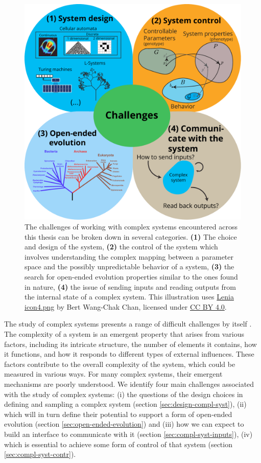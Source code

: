 \begin{figure}[htbp]
  \centering
  \includegraphics[width=.98\linewidth]{figures/challenges}
  \caption{The challenges of working with complex systems encountered across
    this thesis can be broken down in several categories. \textbf{(1)} The choice
    and design of the system, \textbf{(2)} the control of the system which
    involves understanding the complex mapping between a parameter space and the
    possibly unpredictable behavior of a system, \textbf{(3)} the search for
    open-ended evolution properties similar to the ones found in nature,
    \textbf{(4)} the issue of sending inputs and reading outputs from the
    internal state of a complex system. This illustration uses
    \href{https://commons.wikimedia.org/wiki/File:Lenia_icon4.png}{Lenia
      icon4.png} by Bert Wang-Chak Chan, licensed under
    \href{https://creativecommons.org/licenses/by-sa/4.0/}{CC BY 4.0}. }
  \label{fig:challenges}
\end{figure}

The study of complex systems presents a range of difficult challenges by itself
\parencite{sanmiguelChallengesComplexSystems2012}. 
The complexity of a system is an emergent property that arises from various factors, 
including its intricate structure, the number of elements it contains, how it functions, 
and how it responds to different types of external influences. These factors contribute 
to the overall complexity of the system, which could be measured in various ways.
For many complex systems, their emergent mechanisms are
poorly understood. We identify four main challenges associated with the study of
complex systems: (i) the questions of the design choices in defining and sampling a
complex system (section \ref{sec:design-compl-syst}), (ii) which will in turn define
their potential to support a form of open-ended evolution (section
\ref{sec:open-ended-evolution}) and (iii) how we can expect to build an interface to
communicate with it (section \ref{sec:compl-syst-inputs}), (iv) which is essential to
achieve some form of control of that system (section \ref{sec:compl-syst-contr}).

